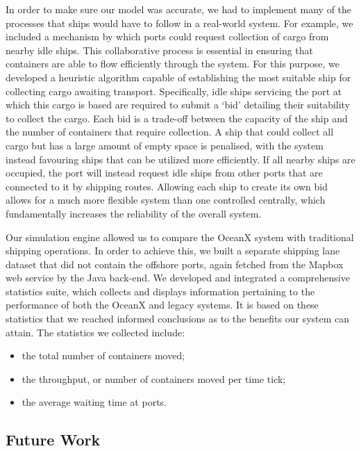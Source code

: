 \newpage
In order to make sure our model was accurate, we had to implement many of the processes that ships would have to follow in a real-world system. For example, we included a mechanism by which ports could request collection of cargo from nearby idle ships. This collaborative process is essential in ensuring that containers are able to flow efficiently through the system. For this purpose, we developed a heuristic algorithm capable of establishing the most suitable ship for collecting cargo awaiting transport. Specifically, idle ships servicing the port at which this cargo is based are required to submit a `bid’ detailing their suitability to collect the cargo. Each bid is a trade-off between the capacity of the ship and the number of containers that require collection. A ship that could collect all cargo but has a large amount of empty space is penalised, with the system instead favouring ships that can be utilized more efficiently. If all nearby ships are occupied, the port will instead request idle ships from other ports that are connected to it by shipping routes. Allowing each ship to create its own bid allows for a much more flexible system than one controlled centrally, which fundamentally increases the reliability of the overall system.

Our simulation engine allowed us to compare the OceanX system with traditional shipping operations. In order to achieve this, we built a separate shipping lane dataset that did not contain the offshore ports, again fetched from the Mapbox web service by the Java back-end. We developed and integrated a comprehensive statistics suite, which collects and displays information pertaining to the performance of both the OceanX and legacy systems. It is based on these statistics that we reached informed conclusions as to the benefits our system can attain. The statistics we collected include:

\begin{itemize}[noitemsep]
	\item the total number of containers moved;
	\item the throughput, or number of containers moved per time tick;
	\item the average waiting time at ports.
\end{itemize}

\subsection{Future Work}

